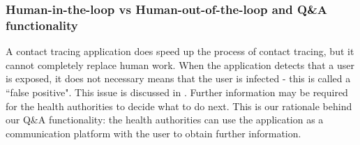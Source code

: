   \subsubsection{Human-in-the-loop vs Human-out-of-the-loop and Q\&A functionality}
    \par A contact tracing application does speed up the process of contact tracing, but it cannot completely replace human work. When the application detects that a user is exposed, it does not necessary means that the user is infected - this is called a ``false positive". This issue is discussed in \cite{BlueTrace1}. Further information may be required for the health authorities to decide what to do next. This is our rationale behind our Q\&A functionality: the health authorities can use the application as a communication platform with the user to obtain further information.




